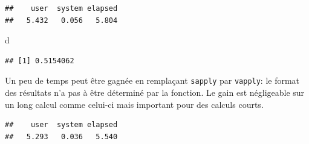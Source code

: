 \documentclass[
  12pt,
  french,
  a4paper,
  extrafontsizes,onecolumn,openright
  ]{memoir}
\newenvironment{Shaded}{\begin{snugshade}}{\end{snugshade}}
\newcommand{\ControlFlowTok}[1]{\textcolor[rgb]{0.13,0.29,0.53}{\textbf{#1}}}
\newcommand{\DecValTok}[1]{\textcolor[rgb]{0.00,0.00,0.81}{#1}}
\newcommand{\KeywordTok}[1]{\textcolor[rgb]{0.13,0.29,0.53}{\textbf{#1}}}
\newcommand{\NormalTok}[1]{#1}
\newcommand{\OperatorTok}[1]{\textcolor[rgb]{0.81,0.36,0.00}{\textbf{#1}}}
\newcommand{\StringTok}[1]{\textcolor[rgb]{0.31,0.60,0.02}{#1}}
\begin{document}
\begin{verbatim}
##    user  system elapsed 
##   5.432   0.056   5.804
\end{verbatim}

\begin{Shaded}
\begin{Highlighting}[]
\NormalTok{d}
\end{Highlighting}
\end{Shaded}

\begin{verbatim}
## [1] 0.5154062
\end{verbatim}

\normalsize

Un peu de temps peut être gagnée en remplaçant \texttt{sapply} par \texttt{vapply}: le format des résultats n'a pas à être déterminé par la fonction.
Le gain est négligeable sur un long calcul comme celui-ci mais important pour des calculs courts.

\scriptsize

\begin{Shaded}
\end{Shaded}

\begin{verbatim}
##    user  system elapsed 
##   5.293   0.036   5.540
\end{verbatim}
\end{document}
